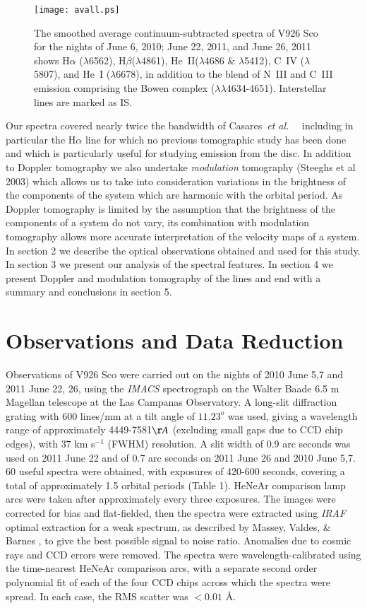 \documentclass{aa}
\def\etal{{\em et al.}\ }
\begin{document}
\begin{figure*}
 \texttt{[image: avall.ps]}
 \caption{The smoothed average continuum-subtracted spectra of V926 Sco for the nights of June 6, 2010; June 22, 2011, and June 26, 2011 shows H$\alpha$ ($\lambda$6562), H$\beta$($\lambda$4861),  He~II($\lambda$4686 \& $\lambda$5412), C~IV ($\lambda$5807), and He~I ($\lambda$6678), in addition to the blend of N~III and 
C~III emission comprising the Bowen complex ($\lambda\lambda$4634-4651). Interstellar lines are marked as IS.}
\label{avspec}
\end{figure*}

Our spectra covered nearly twice the bandwidth of Casares~\etal~\cite{casares} including in particular the H$\alpha$ line for
which no previous tomographic study has been done and which
is particularly useful for studying emission from the disc.  In addition to 
Doppler tomography we also undertake {\it modulation} tomography (Steeghs et al 2003)
which allows us to take into consideration variations in the brightness of the components of the system which are harmonic with the orbital period. As Doppler tomography is limited by the assumption that the brightness of the components of a system do not vary, its combination with modulation tomography allows more accurate interpretation of the velocity maps of a system.
In section 2 we describe the optical observations obtained and used for this study.  In section 3 we present our analysis
of the spectral features.  In section 4 we present Doppler and modulation tomography of the lines and end with a summary
and conclusions in section 5.

\section{Observations and Data Reduction}

Observations of V926 Sco were carried out on the nights of 2010 June 5,7 and 2011 June 22, 26, using the {\it IMACS} spectrograph on the Walter Baade 6.5 m Magellan telescope at the Las Campanas Observatory. A long-slit diffraction grating with 600 lines/mm at a tilt angle of  $11.23^{o}$ was used, giving a wavelength range of approximately 4449-7581${\AA}$
(excluding small gaps due to CCD chip edges), with $37$ km s$^{-1}$ (FWHM) resolution.
A slit width of 0.9 arc seconds was used on 2011 June 22 and of 0.7 arc seconds on 2011 June 26 and 2010 June 5,7. 60 useful spectra were obtained, with exposures of 420-600 seconds, covering a total of approximately 1.5 orbital periods
(Table 1). HeNeAr comparison lamp arcs were taken after approximately every three exposures.
The images were corrected for bias and flat-fielded, then the spectra were extracted using 
{\it IRAF} optimal extraction for a weak spectrum, as described by Massey, Valdes, 
\& Barnes \cite{massey}, to give the best possible signal to noise ratio. 
Anomalies due to cosmic rays and CCD errors were removed. The spectra were
 wavelength-calibrated using the time-nearest HeNeAr comparison arcs, with a 
separate 
second order polynomial fit of each of the four CCD chips across which the spectra
 were spread. In each case, the RMS scatter was $<0.01$ {\AA}.
\end{document}

